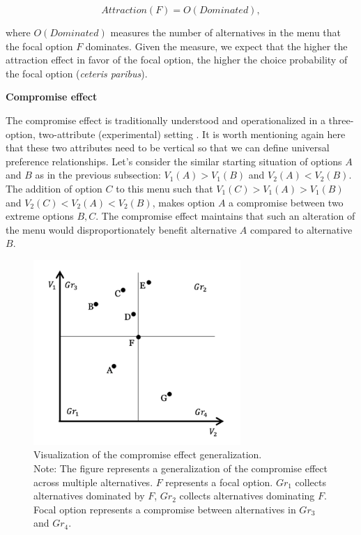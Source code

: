 \documentclass[a4paper,12pt]{article}
\begin{document}
$$Attraction(F)=O(Dominated),$$

where $O(Dominated)$ measures the number of alternatives in the menu that the focal option $F$ dominates. Given the measure, we expect that the higher the attraction effect in favor of the focal option, the higher the choice probability of the focal option (\textit{ceteris paribus}).

\textbf{Compromise effect}

The compromise effect is traditionally understood and operationalized in a three-option, two-attribute (experimental) setting \citep{simonson89, dharEtAl00}. It is worth mentioning again here that these two attributes need to be vertical so that we can define universal preference relationships. Let's consider the similar starting situation of options $A$ and $B$ as in the previous subsection: $V_1(A) > V_1(B)$ and $V_2(A) < V_2(B)$. The addition of option $C$ to this menu such that $V_1(C) > V_1(A) > V_1(B)$ and $V_2(C) < V_2(A) < V_2(B)$, makes option $A$ a compromise between two extreme options $B, C$. The compromise effect 
maintains that such an alteration of the menu would disproportionately benefit alternative $A$ compared to alternative $B$.

\begin{figure}[t]
    \centering
    \includegraphics[width=0.7\textwidth]{staticFiles/compromiseEffectZaksScatterPlot.png}
    \caption{Visualization of the compromise effect generalization.\\ Note: The figure represents a generalization of the compromise effect across multiple alternatives. $F$ represents a focal option. $Gr_1$ collects alternatives dominated by $F$, $Gr_2$ collects alternatives dominating $F$. Focal option represents a compromise between alternatives in $Gr_3$ and $Gr_4$.}
    \label{fig:compromiseZakVisualization}
\end{figure}
\end{document}
